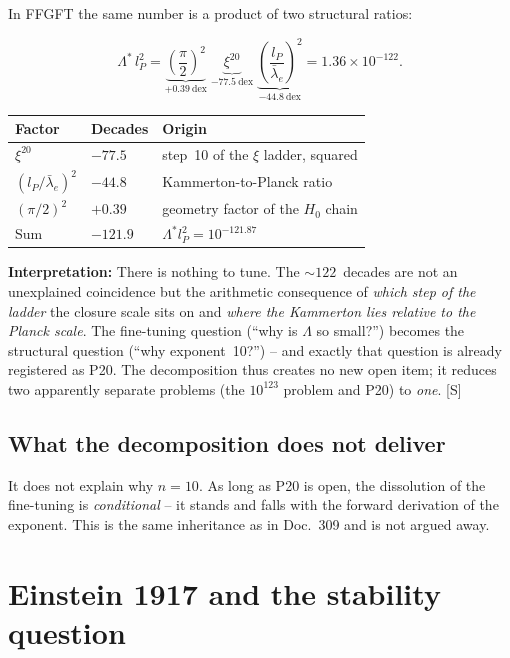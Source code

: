 In FFGFT the same number is a product of two structural ratios:

\begin{equation}
  \Lambda^{*}\,l_P^{2}
  = \underbrace{\left(\frac{\pi}{2}\right)^{2}}_{+0.39~\text{dex}}
    \;\underbrace{\xi^{20}}_{-77.5~\text{dex}}
    \;\underbrace{\left(\frac{l_P}{\bar\lambda_e}\right)^{2}}_{-44.8~\text{dex}}
  = 1.36\times10^{-122}.
  \label{eq:decomp}
\end{equation}

\begin{center}
\begin{tabular}{lll}
\toprule
Factor & Decades & Origin \\
\midrule
$\xi^{20}$ & $-77.5$ & step~10 of the $\xi$ ladder, squared \\
$(l_P/\bar\lambda_e)^2$ & $-44.8$ & Kammerton-to-Planck ratio \\
$(\pi/2)^2$ & $+0.39$ & geometry factor of the $H_0$ chain \\
\midrule
Sum & $-121.9$ & $\Lambda^{*}l_P^2 = 10^{-121.87}$ \\
\bottomrule
\end{tabular}
\end{center}

\textbf{Interpretation:} There is nothing to tune. The
$\sim\!122$~decades are not an unexplained coincidence but the
arithmetic consequence of \emph{which step of the ladder} the
closure scale sits on and \emph{where the Kammerton lies relative
to the Planck scale}. The fine-tuning question
(\enquote{why is $\Lambda$ so small?}) becomes the structural
question (\enquote{why exponent~10?}) -- and exactly that question
is already registered as P20. The decomposition thus creates no new
open item; it reduces two apparently separate problems (the
$10^{123}$ problem and P20) to \emph{one}. [S]

\section{What the decomposition does not deliver}

It does not explain why $n=10$. As long as P20 is open, the
dissolution of the fine-tuning is \emph{conditional} -- it stands
and falls with the forward derivation of the exponent. This is the
same inheritance as in Doc.~309 and is not argued away.

\chapter{Einstein 1917 and the stability question}
\label{ch:einstein1917}

